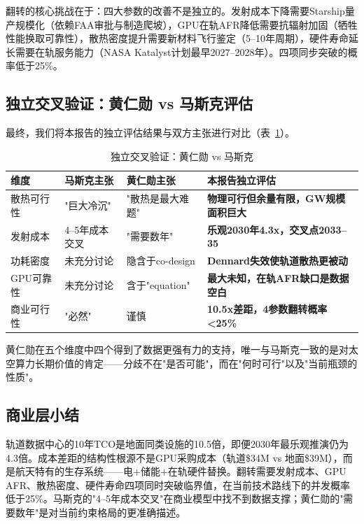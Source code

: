 翻转的核心挑战在于：四大参数的改善不是独立的。发射成本下降需要Starship量产规模化（依赖FAA审批与制造爬坡），GPU在轨AFR降低需要抗辐射加固（牺牲性能换取可靠性），散热密度提升需要新材料飞行鉴定（5--10年周期），硬件寿命延长需要在轨服务能力（NASA Katalyst计划最早2027--2028年）。四项同步突破的概率低于25\%。

\subsection{独立交叉验证：黄仁勋 vs 马斯克评估}

最终，我们将本报告的独立评估结果与双方主张进行对比（表~\ref{tab:cross_validate}）。

\begin{table}[H]
\centering
\footnotesize
\caption{独立交叉验证：黄仁勋 vs 马斯克}
\label{tab:cross_validate}
\begin{tabularx}{\textwidth}{p{2.0cm}p{2.2cm}p{2.2cm}X}
\toprule
\textbf{维度} & \textbf{马斯克主张} & \textbf{黄仁勋主张} & \textbf{本报告独立评估} \\
\midrule
散热可行性   & "巨大冷沉"     & "散热是最大难题"    & \textbf{物理可行但余量有限，GW规模面积巨大} \\
发射成本     & 4--5年成本交叉     & "需要数年"          & \textbf{乐观2030年4.3x，交叉点2033--35} \\
功耗密度     & 未充分讨论            & 隐含于co-design & \textbf{Dennard失效使轨道散热更被动} \\
GPU可靠性    & 未充分讨论            & 含于"equation" & \textbf{最大未知，在轨AFR缺口是数据空白} \\
商业可行性   & "必然"               & 谨慎                 & \textbf{10.5x差距，4参数翻转概率<25\%} \\
\bottomrule
\end{tabularx}
\end{table}

黄仁勋在五个维度中四个得到了数据更强有力的支持，唯一与马斯克一致的是对太空算力长期价值的肯定——分歧不在"是否可能"，而在"何时可行"以及"当前瓶颈的性质"。

\subsection{商业层小结}

轨道数据中心的10年TCO是地面同类设施的10.5倍，即便2030年最乐观推演仍为4.3倍。成本差距的结构性根源不是GPU采购成本（轨道\$34M vs 地面\$39M），而是航天特有的生存系统——电+储能+在轨硬件替换。翻转需要发射成本、GPU AFR、散热密度、硬件寿命四项同时突破临界值，在当前技术路线下的并发概率低于25\%。马斯克的"4--5年成本交叉"在商业模型中找不到数据支撑；黄仁勋的"需要数年"是对当前约束格局的更准确描述。
